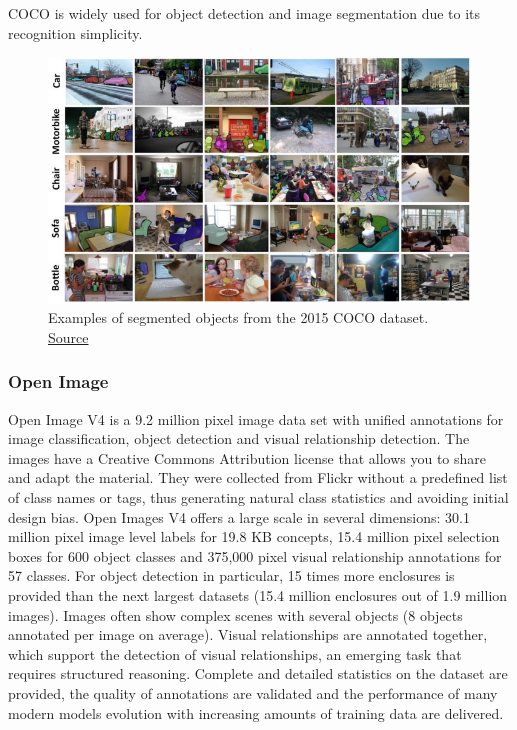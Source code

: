 COCO is widely used for object detection and image segmentation due to its recognition simplicity.

\begin{figure}[H]
    \centering
    \includegraphics[scale = 0.6]{images/coco.png}
	\caption[Example COCO dataset]{Examples of segmented objects from the 2015 COCO dataset. \href{https://arxiv.org/pdf/1405.0312.pdf}{Source}}
	\label{fig:coco}
\end{figure}

\subsubsection{Open Image}
Open Image V4\cite{openimagev4} is a 9.2 million pixel image data set with unified annotations for image classification, object detection and visual relationship detection. The images have a Creative Commons Attribution license that allows you to share and adapt the material. They were collected from Flickr without a predefined list of class names or tags, thus generating natural class statistics and avoiding initial design bias. Open Images V4 offers a large scale in several dimensions: 30.1 million pixel image level labels for 19.8 KB concepts, 15.4 million pixel selection boxes for 600 object classes and 375,000 pixel visual relationship annotations for 57 classes. For object detection in particular, 15 times more enclosures is provided than the next largest datasets (15.4 million enclosures out of 1.9 million images). Images often show complex scenes with several objects (8 objects annotated per image on average). Visual relationships are annotated together, which support the detection of visual relationships, an emerging task that requires structured reasoning. Complete and detailed statistics on the dataset are provided, the quality of annotations are validated and the performance of many modern models evolution with increasing amounts of training data are delivered.

